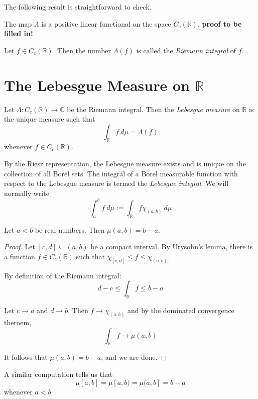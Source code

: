 The following result is straightforward to check.

\begin{proposition}
The map $\Lambda$ is a positive linear functional on the space $C_c ({\mathbb R})$.
\textbf{proof to be filled in!}
\end{proposition}

\begin{definition}
Let $f\in C_c ({\mathbb R})$.  Then the number $\Lambda (f)$ is called the {\em Riemann integral} of $f$.
\end{definition}

\section{The Lebesgue Measure on $\mathbb R$}

\begin{definition}
Let $\Lambda \colon C_c ({\mathbb R})\rightarrow {\mathbb C}$ be the Riemann integral.  Then the {\em Lebesgue measure} on $\mathbb R$ is the unique measure such that
$$\int_{\mathbb R} f\ d\mu = \Lambda (f)$$
whenever $f\in C_c ({\mathbb R})$.
\end{definition}

By the Riesz representation, the Lebesgue measure exists and is unique on the collection of all Borel sets.  The integral of a Borel measurable function with respect to the Lebesgue measure is termed the {\em Lebesgue integral}.  We will normally write
$$\int_a^b f\ d\mu := \int_{\mathbb R} f\chi_{(a,b)}\ d\mu$$

\begin{proposition}
Let $a<b$ be real numbers.  Then $\mu (a,b) = b-a$.
\end{proposition}

\begin{proof}
Let $[c,d]\subseteq (a,b)$ be a compact interval.  By Urysohn's lemma, there is a function $f\in C_c ({\mathbb R})$ such that $\chi_{[c,d]} \leq f \leq \chi_{(a,b)}$.

By definition of the Riemann integral:
$$d-c \leq \int_{\mathbb R} f \leq b-a$$

Let $c\rightarrow a$ and $d\rightarrow b$.  Then $f\rightarrow \chi_{(a,b)}$ and by the dominated convergence theroem, 
$$\int_{\mathbb R} f \rightarrow \mu (a,b)$$

It follows that $\mu (a,b) = b-a$, and we are done.
\end{proof}

A similar computation tells us that
$$\mu [a,b] = \mu [a,b) = \mu (a,b] = b-a$$
whenever $a<b$.

